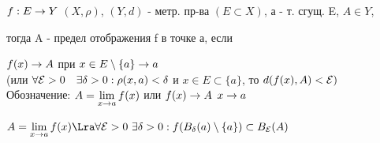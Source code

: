 \documentclass[main]{subfiles}
\begin{document}
  \begin{definition}
      $f:E \rightarrow Y$ $(X, \rho)$, $(Y,d)$ - метр. пр-ва $(E \subset X)$, а - т. сгущ. E, $A \in Y$,

      тогда A - предел отображения f в точке а, если

      $f(x) \rightarrow A$ при $x \in E \setminus \{a\}\rightarrow a$\\
      (или $\forall \mathcal{E}>0 \quad \exists \delta>0: \rho(x,a)<\delta$ и $x \in E \subset \{a\}$, то $d(f(x),A) < \mathcal{E})$\\
      Обозначение: $A=\lim\limits_{x \rightarrow a} f(x)$ или $f(x) \rightarrow A$ $x \rightarrow a$
  \end{definition}

  \begin{remark}
      $A=\lim\limits_{x \ra a} f(x) \Lra \forall \E > 0 \ \e \delta>0: f(B_\delta(a) \setminus \{a\}) \subset B_\E (A)$
  \end{remark}
\end{document}
